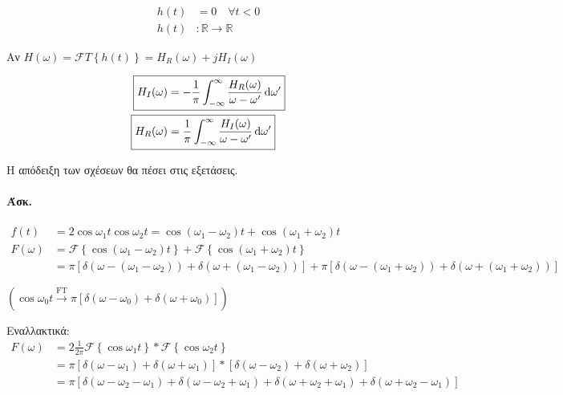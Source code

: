      \paragraph{}
     \begin{align*}
     h(t) &= 0 \quad \forall t < 0 \\
     h(t)&: \mathbb R \to \mathbb R
     \end{align*}
    
    Αν \( H(\omega ) = \mathscr F T\left\lbrace h(t) \right\rbrace = H_R(\omega )
    +jH_I(\omega )
     \)
     
     \begin{align*}
     \Aboxed{ H_I(\omega ) &= -\frac{1}{\pi} \int_{-\infty}^{\infty}
     \frac{H_R(\omega)}{\omega -\omega'}\dif \omega ' } \\
     \Aboxed{ H_R(\omega ) &= \frac{1}{\pi} \int_{-\infty}^{\infty}
     \frac{H_I(\omega )}{\omega -\omega'}\dif \omega' }
     \end{align*}
     
     Η απόδειξη των σχέσεων θα πέσει στις εξετάσεις.
     
     \paragraph{Άσκ.}
     \begin{align*}
     f(t) &= 2\cos\omega_1 t \cos\omega_2 t = \cos(\omega_1-\omega_2)t
     +\cos(\omega_1+\omega_2)t
     \\ F(\omega ) &= \mathscr F\left\lbrace 
     \cos(\omega_1-\omega_2)t
      \right\rbrace + \mathscr F \left\lbrace \cos(\omega_1+\omega_2)t \right\rbrace
      \\ &=
      \pi \left[
      \delta\left( \omega -(\omega_1-\omega_2) \right)
      +\delta\left( \omega +(\omega_1-\omega_2) \right)
      \right] + \pi \left[
      \delta\left( \omega -(\omega_1+\omega_2) \right)
      +\delta\left( \omega +(\omega_1+\omega_2) \right)
      \right] 
     \end{align*}
     
     \( \left( \cos\omega_0t \xrightarrow{\text{FT}}
     \pi\left[ \delta(\omega -\omega_0)+\delta(\omega+\omega_0) \right]
      \right) \)
     
     Εναλλακτικά:
     \begin{align*}
     F(\omega ) &= 2\frac{1}{2\pi}\mathscr F \left\lbrace \cos\omega_1 t \right\rbrace
     * \mathscr F\left\lbrace \cos\omega_2 t \right\rbrace \\
     &= \pi \left[ \delta(\omega -\omega_1)+\delta(\omega+\omega_1) \right]
     * \left[ \delta(\omega -\omega_2)+\delta(\omega+\omega_2) \right]
     \\ &= \pi \left[
     \delta(\omega-\omega_2-\omega_1) +\delta(\omega-\omega_2+\omega_1)
     +\delta(\omega+\omega_2+\omega_1)+\delta(\omega+\omega_2-\omega_1)
     \right]
     \end{align*}
     
